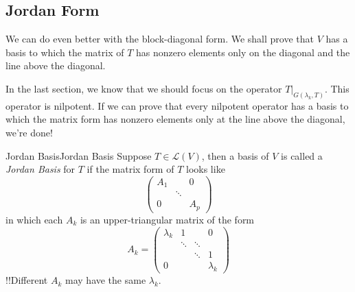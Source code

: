 \documentclass[../main.tex]{subfiles}
\begin{document}
\subsection{Jordan Form}
We can do even better with the block-diagonal form. We shall prove that $V$ has a basis to which the matrix of $T$ has nonzero elements only on the diagonal and the line above the diagonal.

In the last section, we know that we should focus on the operator $T|_{G(\lambda_k,T)}$. This operator is nilpotent. If we can prove that every nilpotent operator has a basis to which the matrix form has nonzero elements only at the line above the diagonal, we're done!

\begin{definition}{Jordan Basis}{Jordan Basis}
Suppose $T\in \mathscr{L}(V)$, then a basis of $V$ is called a \emph{Jordan Basis} for $T$ if the matrix form of $T$ looks like
\begin{equation*}
\begin{pmatrix}
	A_1&&0\\
	   &\ddots &\\
	0&&A_p
\end{pmatrix}
\end{equation*}
in which each $A_k$ is an upper-triangular matrix of the form
\begin{equation*}
A_k = 
\begin{pmatrix}
	\lambda_k&1&&0\\
		 &\ddots &\ddots &\\
		 &&\ddots &1\\
	0&&&\lambda_k
\end{pmatrix}
\end{equation*}
!!Different $A_k$ may have the same $\lambda_k$.
\end{definition}
\end{document}
